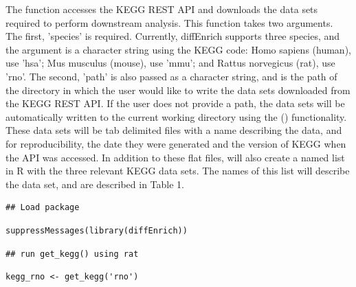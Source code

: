 \documentclass[article]{jss}\usepackage[]{graphicx}\usepackage[]{color}
\makeatletter
\newenvironment{kframe}{%
 \def\at@end@of@kframe{}%
 \ifinner\ifhmode%
  \def\at@end@of@kframe{\end{minipage}}%
  \begin{minipage}{\columnwidth}%
 \fi\fi%
 \def\FrameCommand##1{\hskip\@totalleftmargin \hskip-\fboxsep
 \colorbox{shadecolor}{##1}\hskip-\fboxsep
     \hskip-\linewidth \hskip-\@totalleftmargin \hskip\columnwidth}%
 \MakeFramed {\advance\hsize-\width
   \@totalleftmargin\z@ \linewidth\hsize
   \@setminipage}}%
 {\par\unskip\endMakeFramed%
 \at@end@of@kframe}
\newenvironment{knitrout}{}{} %
\makeatother
\begin{document}
The  function accesses the KEGG REST API and downloads the data
sets required to perform downstream analysis. This function takes two arguments.
The first, 'species' is required. Currently, diffEnrich supports three species,
and the argument is a character string using the KEGG code: Homo sapiens
(human), use 'hsa'; Mus musculus (mouse), use 'mmu'; and Rattus norvegicus
(rat), use 'rno'. The second, 'path' is also passed as a character string, and
is the path of the directory in which the user would like to write the data sets
downloaded from the KEGG REST API. If the user does not provide a path, the data
sets will be automatically written to the current working directory using the
 (\cite{kirill:2017}) functionality. These data sets will be
tab delimited files with a name describing the data, and for reproducibility,
the date they were generated and the version of KEGG when the API was accessed.
In addition to these flat files,  will also create a named list
in R with the three relevant KEGG data sets. The names of this list will
describe the data set, and are described in Table 1.

\begin{knitrout}
\color{fgcolor}\begin{kframe}
\begin{lstlisting}[basicstyle=\ttfamily,breaklines=true]
## Load package\end{lstlisting}
\begin{lstlisting}[basicstyle=\ttfamily,breaklines=true]
suppressMessages(library(diffEnrich))\end{lstlisting}
\begin{lstlisting}[basicstyle=\ttfamily,breaklines=true]
## run get_kegg() using rat\end{lstlisting}
\begin{lstlisting}[basicstyle=\ttfamily,breaklines=true]
kegg_rno <- get_kegg('rno')\end{lstlisting}


{\ttfamily\noindent\itshape\color{messagecolor}{\#\# 3 data sets will be written as tab delimited text files}}

{\ttfamily\noindent\itshape\color{messagecolor}{\#\# File location: /Users/harry/Documents/Saba\_Lab/diffEnrich}}

{\ttfamily\noindent\itshape\color{messagecolor}{\#\# Kegg Release: Release\_94.0+\_04-06\_Apr\_20}}\end{kframe}
\end{knitrout}
\end{document}
